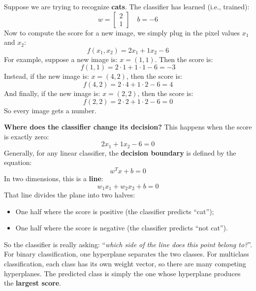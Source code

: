 \highspace
Suppose we are trying to recognize \textbf{cats}. The classifier has learned (i.e., trained):
\begin{equation*}
    w = \begin{bmatrix}
        2 \\ 1
    \end{bmatrix}
    \quad
    b = -6
\end{equation*}
Now to compute the score for a new image, we simply plug in the pixel values $x_1$ and $x_2$:
\begin{equation*}
    f\left(x_1, x_2\right) = 2 x_1 + 1 x_2 - 6
\end{equation*}
For example, suppose a new image is: $x = \left(1, 1\right)$. Then the score is:
\begin{equation*}
    f\left(1, 1\right) = 2 \cdot 1 + 1 \cdot 1 - 6 = -3
\end{equation*}
Instead, if the new image is: $x = \left(4, 2\right)$, then the score is:
\begin{equation*}
    f\left(4, 2\right) = 2 \cdot 4 + 1 \cdot 2 - 6 = 4
\end{equation*}
And finally, if the new image is: $x = \left(2, 2\right)$, then the score is:
\begin{equation*}
    f\left(2, 2\right) = 2 \cdot 2 + 1 \cdot 2 - 6 = 0
\end{equation*}
So every image gets a number.

\highspace
\textcolor{Green3}{ \textbf{Where does the classifier change its decision?}} This happens when the score is exactly zero:
\begin{equation*}
    2 x_1 + 1 x_2 - 6 = 0
\end{equation*}
Generally, for any linear classifier, the \textbf{decision boundary} is defined by the equation:
\begin{equation*}
    w^T x + b = 0
\end{equation*}
In two dimensions, this is a \textbf{line}:
\begin{equation*}
    w_1 x_1 + w_2 x_2 + b = 0
\end{equation*}
That line divides the plane into two halves:
\begin{itemize}
    \item One half where the score is positive (the classifier predicts ``cat'');
    \item One half where the score is negative (the classifier predicts ``not cat'').
\end{itemize}
So the classifier is really asking: ``\emph{which side of the line does this point belong to?}''. For binary classification, one hyperplane separates the two classes. For multiclass classification, each class has its own weight vector, so there are many competing hyperplanes. The predicted class is simply the one whose hyperplane produces the \textbf{largest score}.